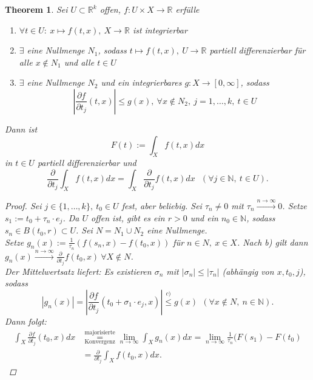 \documentclass[a4paper]{report}
\newcommand{\R}{\mathbb{R}}
\newcommand{\N}{\mathbb{N}}
\newcommand{\toInf}{\rightarrow \infty}
\newcommand{\limToInf}[1]{\lim_{#1 \toInf}}
\newcommand{\jlabel}[1]{\label{j_#1}}
\newcommand{\jabb}[3]{ #1: #2 \rightarrow #3 }
\theoremstyle{plain}
\newtheorem{thm}{Theorem}[chapter]
\theoremstyle{definition}
\begin{document}
{{{{\begin{thm}
\jlabel{Thm 3.16}
    Sei $U \subset \R^k$ offen, $\jabb{f}{U\times X}{\R}$ erfülle
    \begin{enumerate}
        \item $\forall t\in U: \ x\mapsto f(t,x), \ X \rightarrow \R$ ist integrierbar
        \item $\exists$ eine Nullmenge $N_1$, sodass $t\mapsto f(t,x), \ U\rightarrow \R$ partiell differenzierbar für alle $x\notin N_1$ und alle $t\in U$
        \item $\exists$ eine Nullmenge $N_2$ und ein integrierbares $\jabb{g}{X}{[0,\infty]}$, sodass
            \begin{displaymath}
                \left | \frac{\partial f}{\partial t_j}(t,x) \right | \le g(x), \ \forall x\notin N_2, \ j=1,\dots,k, \ t\in U
            \end{displaymath}
    \end{enumerate}
    Dann ist
    \begin{displaymath}
        F(t) := \int_X f(t,x)dx
    \end{displaymath}
    in $t\in U$ partiell differenzierbar und
    \begin{displaymath}
        \frac{\partial}{\partial t_j} \int_X f(t,x)dx = \int_X \frac{\partial}{\partial t_j} f(t,x) dx \ \ \ (\forall j \in \N, \ t\in U).
    \end{displaymath}
    \begin{proof}
        Sei $j\in \{1,\dots,k\}, \ t_0 \in U$ fest, aber beliebig. Sei $\tau_n \ne 0$ mit $\tau_n \xrightarrow{n \rightarrow \infty} 0$. Setze $s_1 := t_0 + \tau_n \cdot e_j$. Da $U$ offen ist, gibt es ein $r>0$ und ein $n_0 \in \N$, sodass $s_n \in B(t_0, r)\subset U$. Sei $N = N_1 \cup N_2$ eine Nullmenge.\\
        Setze $g_n(x) := \frac{1}{\tau_n}(f(s_n,x)-f(t_0,x))$ für $n\in N, \ x\in X$. Nach b) gilt dann $g_n(x) \xrightarrow{n \rightarrow \infty} \frac{\partial}{\partial t_j} f(t_0,x) \ \forall X\notin N$.\\
        Der Mittelwertsatz liefert: Es existieren $\sigma_n$ mit $|\sigma_n| \le |\tau_n|$ (abhängig von $x,t_0,j$), sodass
        \begin{displaymath}
            |g_n(x)| = \left | \frac{\partial f}{\partial t_j} (t_0+\sigma_1\cdot e_j, x) \right| \overset{c)}{\le} g(x) \ \ (\forall x\notin N, \ n\in \N).
        \end{displaymath}
        Dann folgt:
        \begin{displaymath}
            \begin{split}
                \int_X \frac{\partial f}{\partial t_j} (t_0, x)dx &\overset{\text{majorisierte}}{\underset{\text{Konvergenz}}{=}} \limToInf{n} \int_X g_n(x) dx = \limToInf{n} \frac{1}{\tau_n}(F(s_1) - F(t_0) \\
                &= \frac{\partial}{\partial t_j} \int_X f(t_0, x)dx.
            \end{split}
        \end{displaymath}
    \end{proof}
\end{thm}

}}}}
\end{document}
